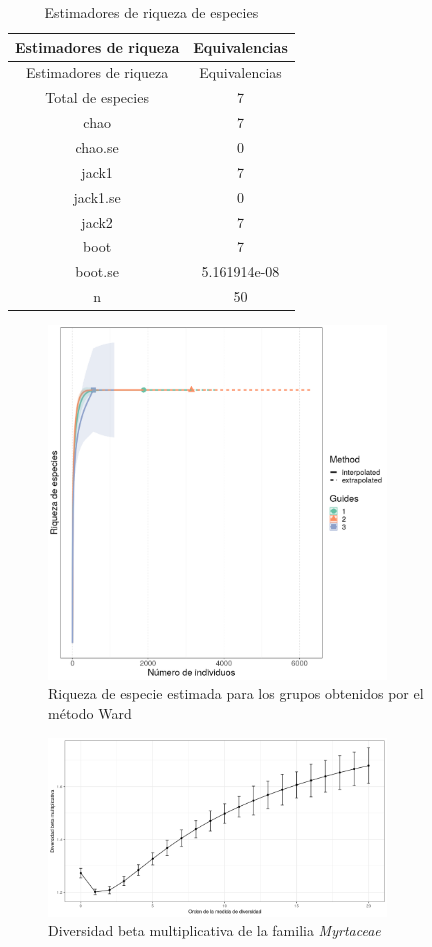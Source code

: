 \documentclass[11pt,]{article}
\begin{document}
\begin{longtable}[]{@{}cc@{}}
\caption{\label{tab:estimadores} Estimadores de riqueza de
especies}\tabularnewline
\toprule
Estimadores de riqueza & Equivalencias\tabularnewline
\midrule
\endfirsthead
\toprule
Estimadores de riqueza & Equivalencias\tabularnewline
\midrule
\endhead
Total de especies & 7\tabularnewline
chao & 7\tabularnewline
chao.se & 0\tabularnewline
jack1 & 7\tabularnewline
jack1.se & 0\tabularnewline
jack2 & 7\tabularnewline
boot & 7\tabularnewline
boot.se & 5.161914e-08\tabularnewline
n & 50\tabularnewline
\bottomrule
\end{longtable}

\begin{figure}
\centering
\includegraphics[width=0.80000\textwidth]{riq_espc_est.png}
\caption{Riqueza de especie estimada para los grupos obtenidos por el
método Ward\label{fig:riq_est}}
\end{figure}

\begin{figure}
\centering
\includegraphics[width=0.80000\textwidth]{div_beta_multi.png}
\caption{Diversidad beta multiplicativa de la familia
\emph{Myrtaceae}\label{fig:beta}}
\end{figure}
\end{document}
